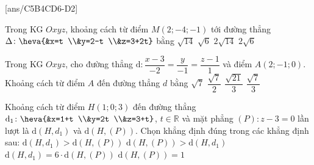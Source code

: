 \TN
{}[ans/C5B4CD6-D2]
\begin{ex}%
	Trong KG $Oxyz$, khoảng cách từ điểm $M(2;-4;-1)$ tới đường thẳng $\Delta\colon \heva{&x=t \\&y=2-t \\&z=3+2t}$ bằng
	\choice
	{$\sqrt{14}$}
	{$\sqrt{6}$}
	{\True $2\sqrt{14}$}
	{$2\sqrt{6}$}
\end{ex}
\begin{ex}%
	Trong KG $Oxyz$, cho đường thẳng $\mathrm{d}\colon\dfrac{x-3}{-2}=\dfrac{y}{-1}=\dfrac{z-1}{1}$ và điểm $A(2;-1;0)$. Khoảng cách từ điểm $A$ đến đường thẳng $d$ bằng
	\choice
	{$\sqrt{7}$}
	{$\dfrac{\sqrt{7}}{2}$}
	{\True $\dfrac{\sqrt{21}}{3}$}
	{$\dfrac{\sqrt{7}}{3}$}
\end{ex}
\begin{ex}%
	Khoảng cách từ điểm $H(1;0;3)$ đến đường thẳng $\mathrm{d}_1\colon \heva{&x=1+t \\&y=2t \\&z=3+t}$, $t\in \mathbb{R}$ và mặt phẳng $(P)\colon z-3=0$ lần lượt là $\mathrm{d}(H,d_1)$ và $\mathrm{d}(H,(P))$. Chọn khẳng định đúng trong các khẳng định sau:
	\choice
	{$\mathrm{d}(H,d_1)>\mathrm{d}(H,(P))$}
	{$\mathrm{d}(H,(P))>\mathrm{d}(H,d_1)$}
	{\True $\mathrm{d}(H,d_1)=6\cdot \mathrm{d}(H,(P))$}
	{$\mathrm{d}(H,(P))=1$}
\end{ex}

